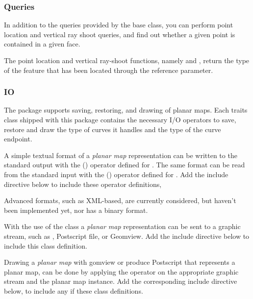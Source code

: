 \subsubsection{Queries}

In addition to the queries provided by the 
base class, you can perform point location and vertical ray shoot
queries, and find out whether a given point is contained in a given
face.

The point location and vertical ray-shoot functions, namely
and
,
return the type of the feature that has been located through the
 reference parameter.

\subsubsection{IO}
The  package supports saving, restoring, and drawing
of planar maps. Each traits class shipped with this package contains
the necessary I/O operators to save, restore and draw the type of
curves it handles and the type of the curve endpoint.

A simple textual format of a {\em planar map} representation can be
written to the standard output with the  (\ccc{ >> })
operator defined for . The same format can be read
from the standard input with the  (\ccc{ << }) operator
defined for . Add the include directive below to
include these operator definitions,


Advanced formats, such as XML-based, are currently considered, but
haven't been implemented yet, nor has a binary format.

With the use of the  class a {\em planar map}
representation can be sent to a graphic stream, such as
, Postscript file, or Geomview. Add the include
directive below to include this class definition.


Drawing a {\em planar map} with gomview or produce Postscript that
represents a planar map, can be done by applying the 
operator on the appropriate graphic stream and the planar map
instance. Add the corresponding include directive below, to include
any if these class definitions.

